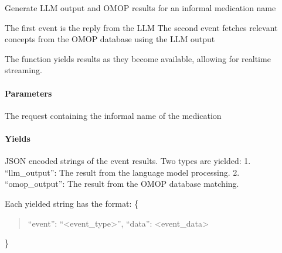 \documentclass[letterpaper,10pt,english]{sphinxmanual}
\begin{document}

\begin{fulllineitems}
\label{\detokenize{autoapi/app/index:app.generate_events}}
\pysigstartsignatures
{}
\pysigstopsignatures
\sphinxAtStartPar
Generate LLM output and OMOP results for an informal medication name

\sphinxAtStartPar
The first event is the reply from the LLM
The second event fetches relevant concepts from the OMOP database using the LLM output

\sphinxAtStartPar
The function yields results as they become available, allowing for real\sphinxhyphen{}time streaming.


\paragraph{Parameters}
\label{\detokenize{autoapi/app/index:parameters}}\begin{description}
\sphinxAtStartPar
The request containing the informal name of the medication

\end{description}


\paragraph{Yields}
\label{\detokenize{autoapi/app/index:yields}}\begin{description}
\sphinxAtStartPar
JSON encoded strings of the event results. Two types are yielded:
1. “llm\_output”: The result from the language model processing.
2. “omop\_output”: The result from the OMOP database matching.

\end{description}

\sphinxAtStartPar
Each yielded string has the format:
\{
\begin{quote}

\sphinxAtStartPar
“event”: “\textless{}event\_type\textgreater{}”,
“data”: \textless{}event\_data\textgreater{}
\end{quote}

\sphinxAtStartPar
\}

\end{fulllineitems}
\end{document}
